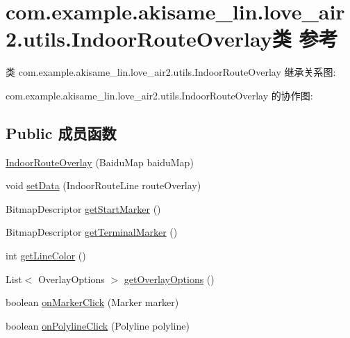 \hypertarget{classcom_1_1example_1_1akisame__lin_1_1love__air2_1_1utils_1_1_indoor_route_overlay}{}\section{com.\+example.\+akisame\+\_\+lin.\+love\+\_\+air2.\+utils.\+Indoor\+Route\+Overlay类 参考}
\label{classcom_1_1example_1_1akisame__lin_1_1love__air2_1_1utils_1_1_indoor_route_overlay}


类 com.\+example.\+akisame\+\_\+lin.\+love\+\_\+air2.\+utils.\+Indoor\+Route\+Overlay 继承关系图\+:


com.\+example.\+akisame\+\_\+lin.\+love\+\_\+air2.\+utils.\+Indoor\+Route\+Overlay 的协作图\+:
\subsection*{Public 成员函数}
\begin{DoxyCompactItemize}
\item 
\mbox{\hyperlink{classcom_1_1example_1_1akisame__lin_1_1love__air2_1_1utils_1_1_indoor_route_overlay_ada557137af5ae891109e0b37489eae1e}{Indoor\+Route\+Overlay}} (Baidu\+Map baidu\+Map)
\item 
void \mbox{\hyperlink{classcom_1_1example_1_1akisame__lin_1_1love__air2_1_1utils_1_1_indoor_route_overlay_aae07a604ad0ab77f57449c098958976e}{set\+Data}} (Indoor\+Route\+Line route\+Overlay)
\item 
Bitmap\+Descriptor \mbox{\hyperlink{classcom_1_1example_1_1akisame__lin_1_1love__air2_1_1utils_1_1_indoor_route_overlay_a0ff22923af593d24be58f9b7272b1c2d}{get\+Start\+Marker}} ()
\item 
Bitmap\+Descriptor \mbox{\hyperlink{classcom_1_1example_1_1akisame__lin_1_1love__air2_1_1utils_1_1_indoor_route_overlay_ac32598743ae8864b0c418028405ee805}{get\+Terminal\+Marker}} ()
\item 
int \mbox{\hyperlink{classcom_1_1example_1_1akisame__lin_1_1love__air2_1_1utils_1_1_indoor_route_overlay_a972e8c904e6e5cd21ee47782f14f44a1}{get\+Line\+Color}} ()
\item 
List$<$ Overlay\+Options $>$ \mbox{\hyperlink{classcom_1_1example_1_1akisame__lin_1_1love__air2_1_1utils_1_1_indoor_route_overlay_a4741ea12678540a6f82ceb5443a89a3a}{get\+Overlay\+Options}} ()
\item 
boolean \mbox{\hyperlink{classcom_1_1example_1_1akisame__lin_1_1love__air2_1_1utils_1_1_indoor_route_overlay_aa2e40546b49fea7392a4f06dfecf9da4}{on\+Marker\+Click}} (Marker marker)
\item 
boolean \mbox{\hyperlink{classcom_1_1example_1_1akisame__lin_1_1love__air2_1_1utils_1_1_indoor_route_overlay_a064002c7a282fdf8380f52fe3a19b0c2}{on\+Polyline\+Click}} (Polyline polyline)
\end{DoxyCompactItemize}

